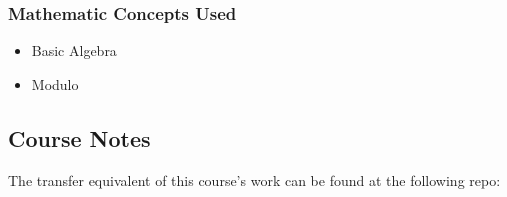 {\begin{highlight}[\CSPBIntro]
        \subsubsection*{Mathematic Concepts Used}
    
        \begin{itemize}
            \item Basic Algebra
            \item Modulo
        \end{itemize}
    \end{highlight}
}

\subsection{Course Notes}

The transfer equivalent of this course's work can be found at the following repo: 
